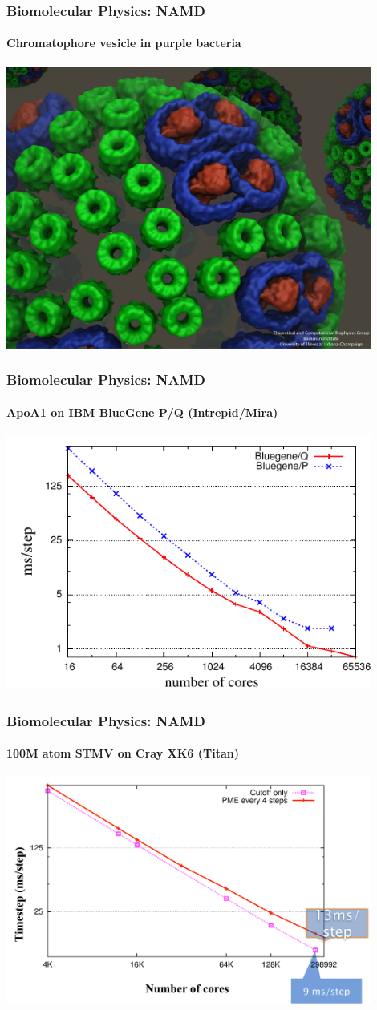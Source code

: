 \begin{frame}
\frametitle{Biomolecular Physics: NAMD}
\framesubtitle{Chromatophore vesicle in purple bacteria}
\includegraphics[width=0.9\textwidth]{../figures/namd/chromatophore-vesicle-2012-01.jpg}
\end{frame}


\begin{frame}
\frametitle{Biomolecular Physics: NAMD}
\framesubtitle{ApoA1 on IBM BlueGene P/Q (Intrepid/Mira)}
\begin{center}
\includegraphics[width=0.9\textwidth]{../figures/apoa1-pme4-PQ.pdf}
\end{center}
\end{frame}


\begin{frame}
\frametitle{Biomolecular Physics: NAMD}
\framesubtitle{100M atom STMV on Cray XK6 (Titan)}
\includegraphics[width=0.9\textwidth]{../figures/namd_titan.pdf}
\end{frame}


